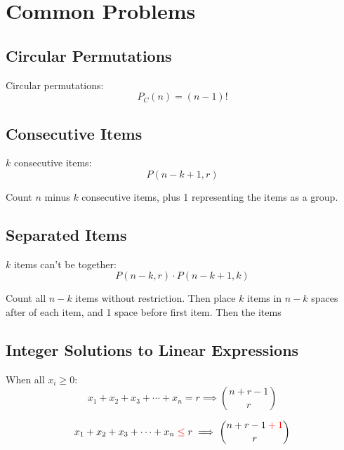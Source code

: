 \documentclass{article}
\begin{document}
    \section{Common Problems}

    \subsection{Circular Permutations}

    Circular permutations: \begin{equation}
        P_C(n) = (n - 1)!
    \end{equation}

    \subsection{Consecutive Items}

    $k$ consecutive items: \begin{equation}
        P(n - k + 1, r)
    \end{equation}

    Count $n$ minus $k$ consecutive items, plus 1 representing the items as a group.

    \subsection{Separated Items}

    $k$ items can't be together: \begin{equation}
        P(n - k, r) \cdot P(n - k + 1, k)
    \end{equation}

    Count all $n - k$ items without restriction. Then place $k$ items in $n - k$ spaces after of each item, and 1 space before first item. Then the items

    \subsection{Integer Solutions to Linear Expressions}

    When all $x_i \geq 0$: \begin{equation}
        x_1 + x_2 + x_3 + \cdots + x_n = r \implies {n + r - 1 \choose r}
    \end{equation}
    
    \begin{equation}
        x_1 + x_2 + x_3 + \cdots + x_n \color{red}\leq\color{black} r \implies {n + r - 1 \color{red}+ 1\color{black} \choose r}
    \end{equation}
    
\end{document}
